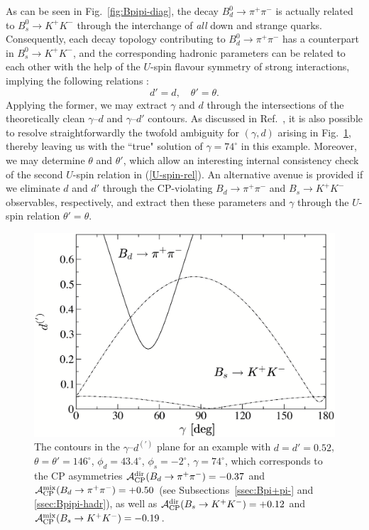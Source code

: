 \documentclass[11pt]{cernrep}
\begin{document}
As can be seen in Fig.~\ref{fig:Bpipi-diag}, the decay 
$B^0_d\to\pi^+\pi^-$ is actually related to $B^0_s\to K^+K^-$ through the interchange 
of {\it all} down and strange quarks. Consequently, each decay topology contributing
to $B^0_d\to\pi^+\pi^-$ has a counterpart in $B^0_s\to K^+K^-$, and
the corresponding hadronic parameters can be related to each other
with the help of the $U$-spin flavour symmetry of strong interactions,
implying the following relations \cite{RF-BsKK}:
\begin{equation}\label{U-spin-rel}
d'=d, \quad \theta'=\theta.
\end{equation}
Applying the former, we may extract $\gamma$ and $d$ through the 
intersections of the theoretically clean $\gamma$--$d$ and $\gamma$--$d'$ 
contours. As discussed in Ref.~\cite{RF-BsKK}, it is also possible to resolve 
straightforwardly the 
twofold ambiguity for $(\gamma,d)$ arising in Fig.~\ref{fig:Bs-Bd-contours},
thereby leaving us with the ``true" solution of $\gamma=74^\circ$ in
this example. Moreover, we may determine $\theta$ and $\theta'$, which
allow an interesting internal consistency check of the second $U$-spin relation 
in (\ref{U-spin-rel}). An alternative avenue is provided if we eliminate $d$ and 
$d'$ through the CP-violating $B_d\to\pi^+\pi^-$ and $B_s\to K^+K^-$
observables, respectively, and extract then these parameters and $\gamma$ 
through the $U$-spin relation $\theta'=\theta$.


\begin{figure}[t]
   \centering
   \includegraphics[width=7.4truecm]{Bs-Bd-contours.ps} 
   \vspace*{-0.6truecm}
   \caption{The contours in the $\gamma$--$d^{(')}$ plane for an example with
   $d=d'=0.52$, $\theta=\theta'=146^\circ$, $\phi_d=43.4^\circ$, $\phi_s=-2^\circ$,
   $\gamma=74^\circ$, which corresponds to the CP asymmetries
   ${\cal A}_{\rm CP}^{\rm dir}(B_d\to\pi^+\pi^-)=-0.37$ and 
   ${\cal A}_{\rm CP}^{\rm mix}(B_d\to\pi^+\pi^-)=+0.50$
   (see Subsections~\ref{ssec:Bpi+pi-} and \ref{ssec:Bpipi-hadr}), as well as
   ${\cal A}_{\rm CP}^{\rm dir}(B_s\to K^+K^-)=+0.12$ and
   ${\cal A}_{\rm CP}^{\rm mix}(B_s\to K^+K^-)=-0.19$.}\label{fig:Bs-Bd-contours}
\end{figure}
\end{document}
